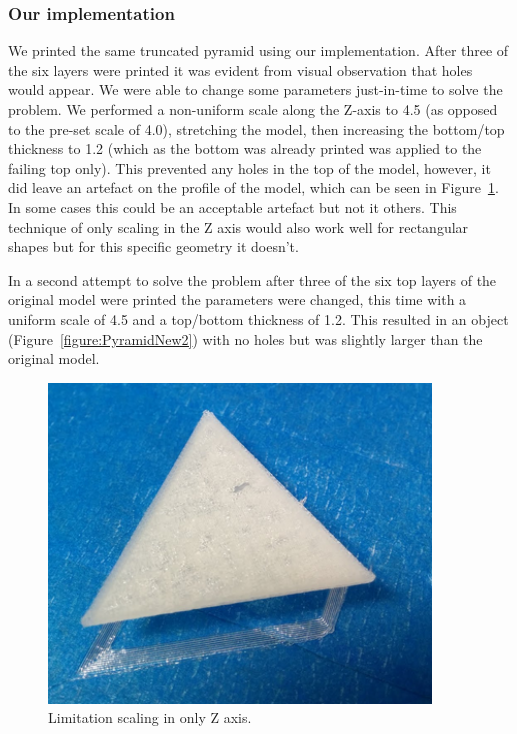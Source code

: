 \documentclass[11pt]{report} %
\begin{document}
\subsubsection{Our implementation}
We printed the same truncated pyramid using our implementation. After three of the six layers were printed it was evident from visual observation that holes would appear. We were able to change some parameters just-in-time to solve the problem. We performed a non-uniform scale along the Z-axis to 4.5 (as opposed to the pre-set scale of 4.0), stretching the model, then increasing the bottom/top thickness to 1.2 (which as the bottom was already printed was applied to the failing top only). This prevented any holes in the top of the model, however, it did leave an artefact on the profile of the model, which can be seen in Figure~\ref{figure:PyramidNew1}. In some cases this could be an acceptable artefact but not it others. This technique of only scaling in the Z axis would also work well for rectangular shapes but for this specific geometry it doesn't.

In a second attempt to solve the problem after three of the six top layers of the original model were printed the parameters were changed, this time with a uniform scale of 4.5 and a top/bottom thickness of 1.2. This resulted in an object (Figure~\ref{figure:PyramidNew2}) with no holes but was slightly larger than the original model.

\begin{figure}[H]
  \centering
  \includegraphics[width=4in]{PyramidOld1.png}
  \caption{Limitation scaling in only Z axis.}
  \label{figure:PyramidNew1}
\end{figure}
\end{document}
